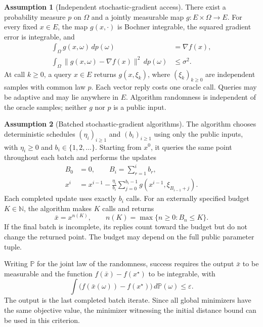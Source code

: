 \documentclass[10pt]{article}
\theoremstyle{definition}
\newtheorem{assumption}{Assumption}
\begin{document}
\begin{assumption}[Independent stochastic-gradient access]
There exist a probability measure $p$ on $\Omega$ and a jointly measurable map $g:E\times\Omega\to E$. For every fixed $x\in E$, the map $g(x,\cdot)$ is Bochner integrable, the squared gradient error is integrable, and
\begin{align*}
\int_{\Omega}g(x,\omega)\,dp(\omega)&=\nabla f(x),\\
\int_{\Omega}\|g(x,\omega)-\nabla f(x)\|^2\,dp(\omega)&\leq\sigma^2.
\end{align*}
At call $k\geq0$, a query $x\in E$ returns $g(x,\xi_k)$, where $(\xi_k)_{k\geq0}$ are independent samples with common law $p$. Each vector reply costs one oracle call. Queries may be adaptive and may lie anywhere in $E$. Algorithm randomness is independent of the oracle samples; neither $g$ nor $p$ is a public input.
\end{assumption}

\begin{assumption}[Batched stochastic-gradient algorithms]
The algorithm chooses deterministic schedules $(\eta_i)_{i\geq1}$ and $(b_i)_{i\geq1}$ using only the public inputs, with $\eta_i\geq0$ and $b_i\in\{1,2,\ldots\}$. Starting from $x^0$, it queries the same point throughout each batch and performs the updates
\begin{align*}
B_0&=0,\qquad B_i=\sum_{r=1}^{i}b_r,\\
x^i&=x^{i-1}-\frac{\eta_i}{b_i}
\sum_{j=0}^{b_i-1}g(x^{i-1},\xi_{B_{i-1}+j}).
\end{align*}
Each completed update uses exactly $b_i$ calls. For an externally specified budget $K\in\mathbb{N}$, the algorithm makes $K$ calls and returns
\[
\bar{x}=x^{n(K)},\qquad
n(K)=\max\{n\geq0:B_n\leq K\}.
\]
If the final batch is incomplete, its replies count toward the budget but do not change the returned point. The budget may depend on the full public parameter tuple.
\end{assumption}

Writing $\mathbb{P}$ for the joint law of the randomness, success requires the output $\bar{x}$ to be measurable and the function $f(\bar{x})-f(x^\star)$ to be integrable, with
\[
\int \bigl(f(\bar{x}(\omega))-f(x^\star)\bigr)
\,d\mathbb{P}(\omega)\leq\varepsilon.
\]
The output is the last completed batch iterate. Since all global minimizers have the same objective value, the minimizer witnessing the initial distance bound can be used in this criterion.
\end{document}
